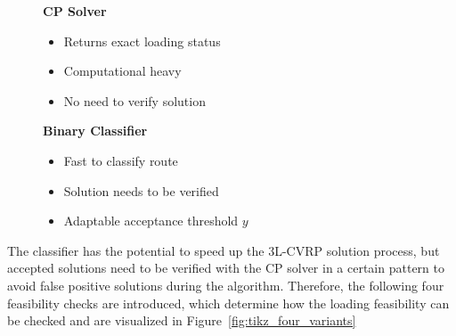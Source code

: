 \begin{figure}[ht]
    \centering
    \begin{minipage}[centering]{0.45\textwidth}
        \textbf{CP Solver}
        \begin{itemize}
            \item Returns exact loading status
            \item Computational heavy
            \item No need to verify solution
        \end{itemize}
    \end{minipage}
    \begin{minipage}[centering]{0.45\textwidth}
        \textbf{Binary Classifier}
        \begin{itemize}
            \item Fast to classify route
            \item Solution needs to be verified
            \item Adaptable acceptance threshold $y$
        \end{itemize}
    \end{minipage}
\end{figure}

The classifier has the potential to speed up the \gls{3L-CVRP} solution process, but accepted solutions need to be
verified with the \gls{CP} solver in a certain pattern to avoid false positive solutions during the algorithm.
Therefore, the following four feasibility checks are introduced, which determine how the loading feasibility can be checked and are
visualized in Figure~\ref{fig:tikz_four_variants}



